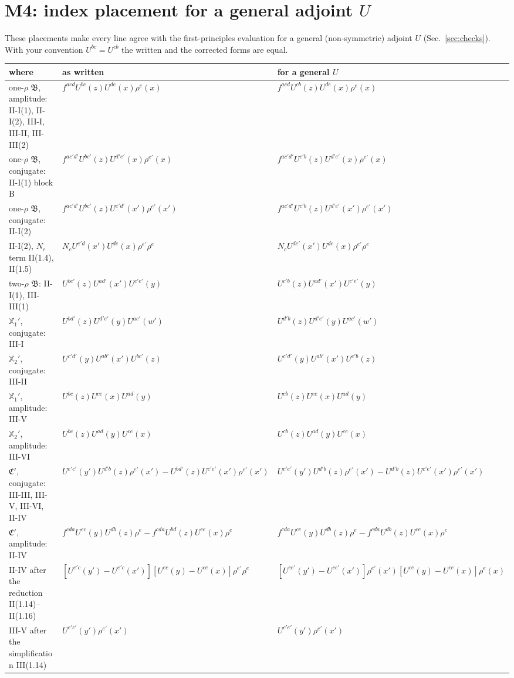 \documentclass[10pt]{article}
\numberwithin{equation}{section}
\begin{document}
\section{M4: index placement for a general adjoint \texorpdfstring{$U$}{U}}\label{sec:M4}
These placements make every line agree with the first-principles evaluation for a general (non-symmetric) adjoint $U$ (Sec.~\ref{sec:checks}). With your convention $U^{bc}=U^{cb}$ the written and the corrected forms are equal.
\begin{center}\small
\begin{longtable}{@{}p{}p{}p{}@{}}
\toprule
where & as written & for a general $U$\\ \midrule
one-$\rho$ $\mathfrak B$, amplitude: II-I(1), II-I(2), III-I, III-II, III-III(2) & $f^{acd}U^{bc}(z)U^{de}(x)\rho^e(x)$ & $f^{acd}U^{cb}(z)U^{de}(x)\rho^e(x)$\\
one-$\rho$ $\mathfrak B$, conjugate: II-I(1) block B & $f^{ac'd'}U^{bc'}(z)U^{d'e'}(x)\rho^{e'}(x)$ & $f^{ac'd'}U^{c'b}(z)U^{d'e'}(x)\rho^{e'}(x)$\\
one-$\rho$ $\mathfrak B$, conjugate: II-I(2) & $f^{ac'd'}U^{bc'}(z)U^{e'd'}(x')\rho^{e'}(x')$ & $f^{ac'd'}U^{c'b}(z)U^{d'e'}(x')\rho^{e'}(x')$\\
II-I(2), $N_c$ term II(1.4), II(1.5) & $N_cU^{e'd}(x')U^{de}(x)\rho^{e'}\rho^{e}$ & $N_cU^{de'}(x')U^{de}(x)\rho^{e'}\rho^{e}$\\
two-$\rho$ $\mathfrak B$: II-I(1), III-III(1) & $U^{bc'}(z)U^{ad'}(x')U^{c'e'}(y)$ & $U^{c'b}(z)U^{ad'}(x')U^{c'e'}(y)$\\
$\mathbb X_1'$, conjugate: III-I & $U^{bd'}(z)U^{d'e'}(y)U^{ac'}(w')$ & $U^{d'b}(z)U^{d'e'}(y)U^{ac'}(w')$\\
$\mathbb X_2'$, conjugate: III-II & $U^{c'd'}(y)U^{ab'}(x')U^{bc'}(z)$ & $U^{c'd'}(y)U^{ab'}(x')U^{c'b}(z)$\\
$\mathbb X_1'$, amplitude: III-V & $U^{bc}(z)U^{ce}(x)U^{ad}(y)$ & $U^{cb}(z)U^{ce}(x)U^{ad}(y)$\\
$\mathbb X_2'$, amplitude: III-VI & $U^{bc}(z)U^{ad}(y)U^{ce}(x)$ & $U^{cb}(z)U^{ad}(y)U^{ce}(x)$\\
$\mathfrak C'$, conjugate: III-III, III-V, III-VI, II-IV & $U^{e'c'}(y')U^{d'b}(z)\rho^{e'}(x')-U^{bd'}(z)U^{c'e'}(x')\rho^{e'}(x')$ & $U^{c'e'}(y')U^{d'b}(z)\rho^{e'}(x')-U^{d'b}(z)U^{c'e'}(x')\rho^{e'}(x')$\\
$\mathfrak C'$, amplitude: II-IV & $f^{cda}U^{ec}(y)U^{db}(z)\rho^e-f^{cda}U^{bd}(z)U^{ce}(x)\rho^e$ & $f^{cda}U^{ce}(y)U^{db}(z)\rho^e-f^{cda}U^{db}(z)U^{ce}(x)\rho^e$\\
II-IV after the reduction II(1.14)--II(1.16) & $[U^{e'c}(y')-U^{e'c}(x')][U^{ec}(y)-U^{ce}(x)]\rho^{e'}\rho^e$ & $[U^{ce'}(y')-U^{ce'}(x')]\rho^{e'}(x')[U^{ce}(y)-U^{ce}(x)]\rho^e(x)$\\
III-V after the simplification III(1.14) & $U^{e'c'}(y')\rho^{e'}(x')$ & $U^{c'e'}(y')\rho^{e'}(x')$\\
\bottomrule
\end{longtable}
\end{center}
\end{document}
